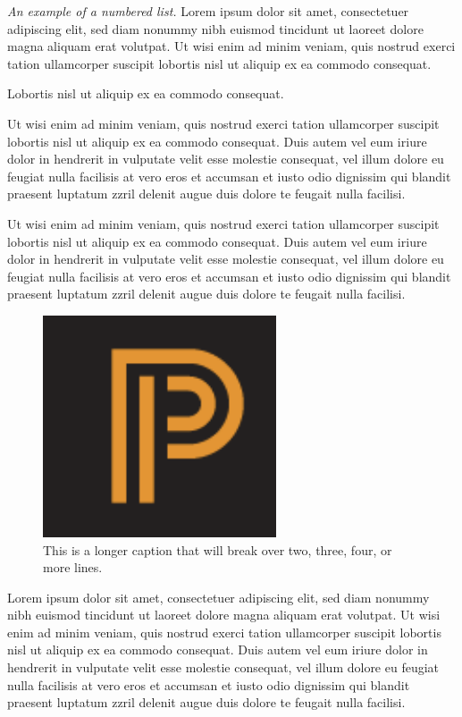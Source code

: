 \documentclass[oldfontcommands,6x9]{pupbook}
\begin{document}
\begin{numberlist}
\item \textit{An example of a numbered list.} Lorem ipsum
dolor sit amet, consectetuer adipiscing elit, sed diam nonummy nibh
euismod tincidunt ut laoreet dolore magna aliquam erat volutpat. Ut wisi
enim ad minim veniam, quis nostrud exerci tation ullamcorper suscipit
lobortis nisl ut aliquip ex ea commodo consequat. 

\item Lobortis nisl ut aliquip ex ea commodo consequat.

\item Ut wisi enim ad minim veniam, quis nostrud exerci tation
ullamcorper suscipit lobortis nisl ut aliquip ex ea commodo consequat.
Duis autem vel eum iriure dolor in hendrerit in vulputate velit esse
molestie consequat, vel illum dolore eu feugiat nulla facilisis at vero
eros et accumsan et iusto odio dignissim qui blandit praesent luptatum
zzril delenit augue duis dolore te feugait nulla facilisi.
\end{numberlist}

Ut wisi enim ad minim veniam, quis nostrud exerci tation ullamcorper
suscipit lobortis nisl ut aliquip ex ea commodo consequat. Duis autem
vel eum iriure dolor in hendrerit in vulputate velit esse molestie
consequat, vel illum dolore eu feugiat nulla facilisis at vero eros et
accumsan et iusto odio dignissim qui blandit praesent luptatum zzril
delenit augue duis dolore te feugait nulla facilisi. 

\begin{figure}
\centerline{\includegraphics{PUPLogo}}
\caption{This is a longer caption that will break over two, three, four, or more lines.}
\end{figure}


Lorem ipsum dolor sit amet, consectetuer adipiscing elit, sed diam
nonummy nibh euismod tincidunt ut laoreet dolore magna aliquam erat
volutpat. Ut wisi enim ad minim veniam, quis nostrud exerci tation
ullamcorper suscipit lobortis nisl ut aliquip ex ea commodo consequat.
Duis autem vel eum iriure dolor in hendrerit in vulputate velit esse
molestie consequat, vel illum dolore eu feugiat nulla facilisis at vero
eros et accumsan et iusto odio dignissim qui blandit praesent luptatum
zzril delenit augue duis dolore te feugait nulla facilisi. 
\end{document}
